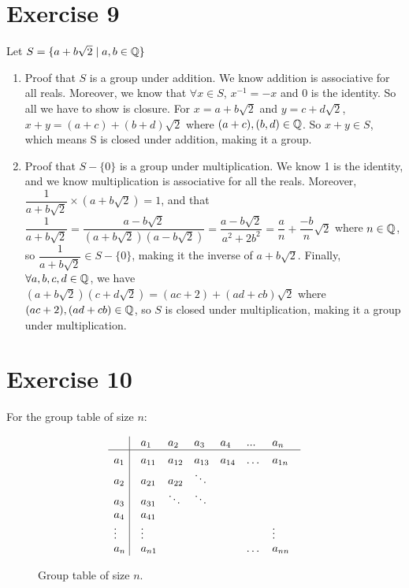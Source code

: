 \documentclass[12pt]{article}
\begin{document}
    \section*{Exercise 9}
    Let $S = \{a + b\sqrt{2} \mid a, b \in \mathbb{Q}\}$
    \begin{enumerate}[label=\textbf{\alph*.}]
        \item 
            Proof that $S$ is a group under addition.
            We know addition is associative for all reals.
            Moreover, we know that $\forall x \in S$, $x^{-1} = -x$
            and 0 is the identity.
            So all we have to show is closure.
            For $x = a + b\sqrt{2}$ and $y = c + d\sqrt{2}$,
            $x + y = (a + c) + (b + d)\sqrt{2}$
            where $(a + c), (b, d) \in \mathbb{Q}$.
            So $x + y \in S$,
            which means S is closed under addition, making it a group. 
        \item
            Proof that $S - \{0\}$ is a group under multiplication.
            We know 1 is the identity,
            and we know multiplication is associative for all the reals.
            Moreover, $\dfrac{1}{a + b\sqrt{2}} \times (a + b\sqrt{2}) = 1$,
            and that $\dfrac{1}{a + b\sqrt{2}}
            = \dfrac{a - b\sqrt{2}}{(a + b\sqrt{2})(a - b\sqrt{2})}
            = \dfrac{a - b\sqrt{2}}{a^{2} + 2b^{2}}
            = \dfrac{a}{n} + \dfrac{-b}{n}\sqrt{2}$
            where $n \in \mathbb{Q}$,
            so $\dfrac{1}{a + b\sqrt{2}} \in S - \{0\}$,
            making it the inverse of $a + b\sqrt{2}$.
            Finally, $\forall a, b, c, d \in \mathbb{Q}$,
            we have $(a + b\sqrt{2})(c + d\sqrt{2})
            = (ac + 2) + (ad + cb)\sqrt{2}$
            where $(ac + 2), (ad + cb) \in \mathbb{Q}$,
            so $S$ is closed under multiplication,
            making it a group under multiplication.
    \end{enumerate}


    \section*{Exercise 10}
    For the group table of size $n$:

    \begin{figure}[H]
        \centering

        \[\vbox{\tabskip0.5em\offinterlineskip
        \halign{\strut$#$\hfil\ \tabskip1em\vrule&&$#$\hfil\cr
        ~   & a_1   & a_2   & a_3 & a_4   & ...   & a_n   \cr
        \noalign{\hrule}\vrule height 12pt width 0pt
        a_1   & a_{11}   & a_{12}   & a_{13} & a_{14} & \dots & a_{1n} \cr
        a_2   & a_{21}   & a_{22} & \ddots \cr
        a_3   & a_{31}   & \ddots & \ddots \cr
        a_4   & a_{41} \cr
        \vdots & \vdots & & & & & \vdots \cr
        a_n   & a_{n1} & & & & \dots & a_{nn} \cr
        }}\]

        \caption{\label{fig:figure1} Group table of size $n$.}
    \end{figure}
\end{document}
